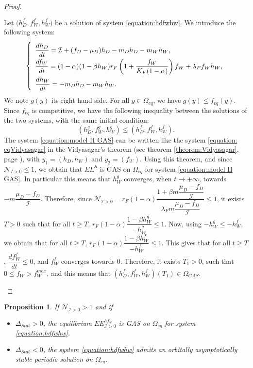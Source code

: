 \documentclass{article}
\newcommand{\lfw}{\lambda_{F}}
\newcommand{\lfw}{\lambda_{F}}
\newcommand{\cI}{\mathcal{I}}
\newcommand{\N}{\mathcal{N}}
\newtheorem{prop}[theorem]{Proposition}
\theoremstyle{definition}
\theoremstyle{remark}
\begin{document}
{\begin{proof}
\begin{itemize}
Let $\Big(h_D^f, f_W^f, h_W^f \Big)$ be a solution of system \eqref{equation:hdfwhw}. We introduce the following system:
\begin{equation}
\def\arraystretch{2}
\left\{ \begin{array}{l}
\dfrac{dh_D}{dt}= \cI + (f_D - \mu_D) h_D - m_D h_D - m_W h_W, \\
\dfrac{df_W}{dt} = (1-\alpha)(1 - \beta h_W) r_F \left(1 + \dfrac{f_W}{K_F(1-\alpha)} \right) f_W + \lfw f_W h_W, \\
\dfrac{dh_W}{dt}= -m_D h_D - m_W h_W. 
\end{array} \right.
\label{equation:model H GAS}
\end{equation}
We note $g(y)$ its right hand side. For all $y \in \Omega_{eq}$, we have $g(y) \leq f_{eq}(y)$. Since $f_{eq}$ is competitive, we have the following inequality between the solutions of the two systems, with the same initial condition:
$$
(h_D^g,f_W^g, h_W^g) \leq (h_D^f,f_W^f, h_W^f).
$$
The system \eqref{equation:model H GAS} can be written like the system \eqref{equation: eqVidyasagar} in the Vidyasagar's theorem (see theorem \ref{theorem:Vidyasagar}, page \pageref{theorem:Vidyasagar}), with $y_1 = (h_D, h_W)$ and $y_2 = (f_W)$. Using this theorem, and since $\N_{I>0} \leq 1$, we obtain that $EE^{h}$ is GAS on $\Omega_{eq}$ for system \eqref{equation:model H GAS}. In particular this means that $h_W^g$ converges, when $t\rightarrow +\infty$, towards $-m\dfrac{\mu_D - f_D}{\cI}$. 
Therefore, since $\N_{\cI > 0} = r_F(1-\alpha)\dfrac{1 + \beta m\dfrac{\mu_D - f_D}{\cI}}{\lfw m\dfrac{\mu_D - f_D}{\cI}} \leq 1$, it exists $T>0$ such that for all $t\geq T$, $r_F(1-\alpha) \dfrac{1-\beta h_W^g}{-h_W^g} \leq 1$. Now, using $-h_W^g \leq -h_W^f$, we obtain that for all $t\geq T$, $r_F(1-\alpha) \dfrac{1-\beta h_W^f}{-h_W^f} \leq 1$. This gives that for all $t\geq T$, $\dfrac{df_W^f}{dt} \leq 0$, and $f_W^f$ converges towards 0. Therefore, it exists $T_1 > 0$, such that $0\leq f_W > f_W^{max}$, and this means that  $(h_D^f,f_W^f, h_W^f)(T_1) \in \Omega_{GAS}$.
\end{itemize}
\end{proof}}


\begin{prop} \label{prop:limitCycle, cI>0}
If $\mathcal{N}_{\cI > 0} > 1$ and if 

\begin{itemize}
\item $\Delta_{Stab} > 0$, the equilibrium $EE^{hf_w}_{\cI >0}$ is GAS on $\Omega_{eq}$ for system \eqref{equation:hdfwhw}.
\item $\Delta_{Stab} < 0$, the system \eqref{equation:hdfwhw} admits an orbitally asymptotically stable periodic solution on $\Omega_{eq}$.
\end{itemize}
\end{prop}
\end{document}
